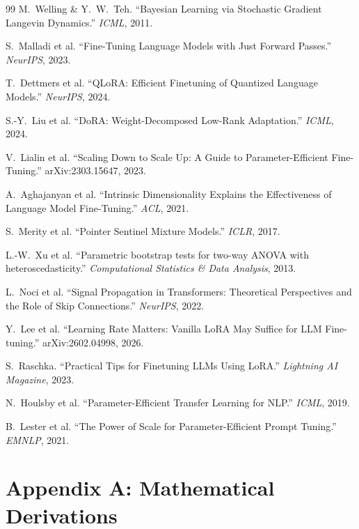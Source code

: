 \documentclass[11pt]{article}
\begin{document}
\begin{thebibliography}{99}
 M.~Welling \& Y.~W.~Teh. ``Bayesian Learning via Stochastic Gradient Langevin Dynamics.'' \textit{ICML}, 2011.

 S.~Malladi et al. ``Fine-Tuning Language Models with Just Forward Passes.'' \textit{NeurIPS}, 2023.

 T.~Dettmers et al. ``QLoRA: Efficient Finetuning of Quantized Language Models.'' \textit{NeurIPS}, 2024.

 S.-Y.~Liu et al. ``DoRA: Weight-Decomposed Low-Rank Adaptation.'' \textit{ICML}, 2024.

 V.~Lialin et al. ``Scaling Down to Scale Up: A Guide to Parameter-Efficient Fine-Tuning.'' arXiv:2303.15647, 2023.

 A.~Aghajanyan et al. ``Intrinsic Dimensionality Explains the Effectiveness of Language Model Fine-Tuning.'' \textit{ACL}, 2021.

 S.~Merity et al. ``Pointer Sentinel Mixture Models.'' \textit{ICLR}, 2017.

 L.-W.~Xu et al. ``Parametric bootstrap tests for two-way ANOVA with heteroscedasticity.'' \textit{Computational Statistics \& Data Analysis}, 2013.

 L.~Noci et al. ``Signal Propagation in Transformers: Theoretical Perspectives and the Role of Skip Connections.'' \textit{NeurIPS}, 2022.

 Y.~Lee et al. ``Learning Rate Matters: Vanilla LoRA May Suffice for LLM Fine-tuning.'' arXiv:2602.04998, 2026.

 S.~Raschka. ``Practical Tips for Finetuning LLMs Using LoRA.'' \textit{Lightning AI Magazine}, 2023.

 N.~Houlsby et al. ``Parameter-Efficient Transfer Learning for NLP.'' \textit{ICML}, 2019.

 B.~Lester et al. ``The Power of Scale for Parameter-Efficient Prompt Tuning.'' \textit{EMNLP}, 2021.

\end{thebibliography}

\section*{Appendix A: Mathematical Derivations}
\end{document}
